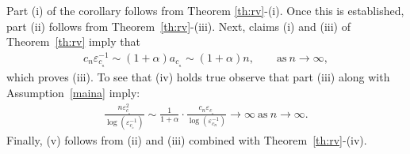 \documentclass[12pt]{amsart}
\begin{document}
Part (i) of the corollary follows from Theorem \ref{th:rv}-(i). Once
this is established, part (ii) follows from
Theorem~\ref{th:rv}-(iii). Next, claims (i) and (iii) of
Theorem~\ref{th:rv} imply that \begin{eqnarray*} c_n {\varepsilon}_{c_{_{n}}}^{-1}\sim
(1+\alpha)a_{c_{_{n}}} \sim (1+\alpha) n,\qquad
\mbox{as}~n\to\infty,\end{eqnarray*} which proves (iii). To see that (iv) holds
true observe that part (iii) along with Assumption~\ref{maina}
imply: \begin{eqnarray*} {\frac {\displaystyle {n {\varepsilon}_{c_{_{n}}}^2}}{\displaystyle {\log
({\varepsilon}^{-1}_{c_{_{n}}})} }}\sim {\frac {\displaystyle {1}}{\displaystyle {1+\alpha} }} \cdot {\frac {\displaystyle {c_n
{\varepsilon}_{c_{_{n}}}}}{\displaystyle {\log ({\varepsilon}_{c_{n}}^{-1})} }} \to
\infty~\mbox{as}~n\to \infty. \end{eqnarray*} Finally, (v) follows from (ii)
and (iii) combined with Theorem~\ref{th:rv}-(iv).
\end{document}
